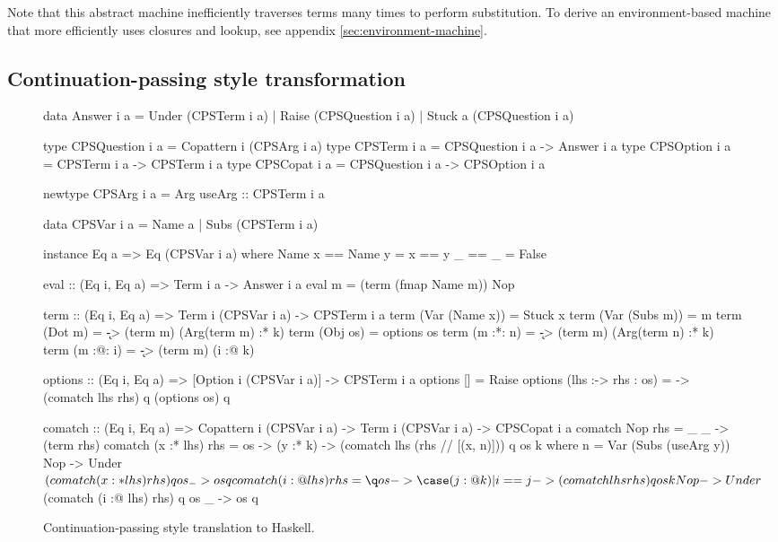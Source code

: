 \documentclass[sigplan,screen]{acmart}
\newcommand{\basicstylesize}{\small}
\begin{document}
\begin{remark}
  \label{rm:environment-machine}
  Note that this abstract machine inefficiently traverses terms many times to
  perform substitution.  To derive an environment-based machine that more
  efficiently uses closures and lookup, see appendix \cref{sec:environment-machine}.
\end{remark}

\subsection{Continuation-passing style transformation}

\begin{figure}
\centering
\renewcommand{\basicstylesize}{\footnotesize}
\begin{haskell}
data Answer i a
  = Under (CPSTerm i a)
  | Raise (CPSQuestion i a)
  | Stuck a (CPSQuestion i a)

type CPSQuestion i a = Copattern i (CPSArg i a)
type CPSTerm i a = CPSQuestion i a -> Answer i a
type CPSOption i a = CPSTerm i a -> CPSTerm i a
type CPSCopat i a = CPSQuestion i a -> CPSOption i a

newtype CPSArg i a = Arg { useArg :: CPSTerm i a }

data CPSVar i a = Name a | Subs (CPSTerm i a)

instance Eq a => Eq (CPSVar i a) where
  Name x == Name y = x == y
  _      == _      = False

eval :: (Eq i, Eq a) => Term i a -> Answer i a
eval m = (term (fmap Name m)) Nop

term :: (Eq i, Eq a) => Term i (CPSVar i a)
     -> CPSTerm i a
term (Var (Name x)) = Stuck x
term (Var (Subs m)) = m
term (Dot m)   = \k -> (term m) (Arg(term m) :* k)
term (Obj os)  = options os
term (m :*: n) = \k -> (term m) (Arg(term n) :* k)
term (m :@: i) = \k -> (term m) (i :@ k)

options :: (Eq i, Eq a) => [Option i (CPSVar i a)]
        -> CPSTerm i a
options [] = Raise
options (lhs :-> rhs : os)
  = \q -> (comatch lhs rhs) q (options os) q

comatch :: (Eq i, Eq a) => Copattern i (CPSVar i a)
        -> Term i (CPSVar i a) -> CPSCopat i a
comatch Nop        rhs = \_ _   -> (term rhs)
comatch (x :* lhs) rhs = \q os -> \case
  (y :* k) -> (comatch lhs (rhs // [(x, n)])) q os k
    where n = Var (Subs (useArg y))
  Nop      -> Under $ (comatch (x :* lhs) rhs) q os
  _        -> os q
comatch (i :@ lhs) rhs = \q os -> \case
  (j :@ k)
  | i == j -> (comatch lhs rhs) q os k
  Nop      -> Under $ (comatch (i :@ lhs) rhs) q os
  _        -> os q
\end{haskell}
\caption{Continuation-passing style translation to Haskell.}
\label{fig:block-cps-code}
\end{figure}
\end{document}
